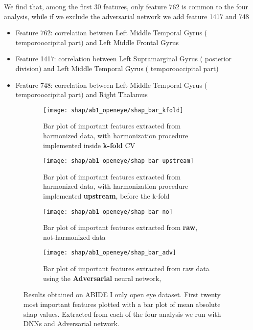 \documentclass[11pt]{report}
\begin{document}
We find that, among the first 30 features, only feature  762 is common to the four analysis, while if we exclude the adversarial network we add feature 1417 and 748




\begin{itemize}
\item Feature 762: correlation between Left Middle Temporal Gyrus ( temporooccipital part) and Left Middle Frontal Gyrus
\item Feature 1417: correlation between Left Supramarginal Gyrus ( posterior division) and Left Middle Temporal Gyrus ( temporooccipital part)
\item Feature 748: correlation between Left Middle Temporal Gyrus ( temporooccipital part) and Right Thalamus
\end{itemize}



\begin{figure}[h!]
\centering
\begin{subfigure}[c]{.45\linewidth}
  \texttt{[image: shap/ab1\_openeye/shap\_bar\_kfold]}
   \caption{Bar plot of important features extracted from harmonized data, with harmonization procedure implemented inside \textbf{k-fold} CV}
    
\end{subfigure}
\begin{subfigure}[c]{.45\textwidth}
   \texttt{[image: shap/ab1\_openeye/shap\_bar\_upstream]}
   \caption{Bar plot of important features extracted from harmonized data, with harmonization procedure implemented \textbf{upstream}, before the k-fold}
    
\end{subfigure}
\hspace{3mm}
\begin{subfigure}[c]{.45\textwidth}
   \texttt{[image: shap/ab1\_openeye/shap\_bar\_no]}
   \caption{Bar plot of important features extracted from \textbf{raw}, not-harmonized data}
    
\end{subfigure}
\begin{subfigure}[c]{.45\textwidth}
   \texttt{[image: shap/ab1\_openeye/shap\_bar\_adv]}
   \caption{Bar plot of important features extracted from raw data using the \textbf{Adversarial} neural network,}
    
\end{subfigure}
\caption{Results obtained on ABIDE I only open eye dataset. First twenty most important features plotted with a bar plot of mean absolute shap values. Extracted from each of the four analysis we run with DNNs and Adversarial network. }
\label{fig:shap_abide_all_ab1}
\end{figure}
\end{document}
